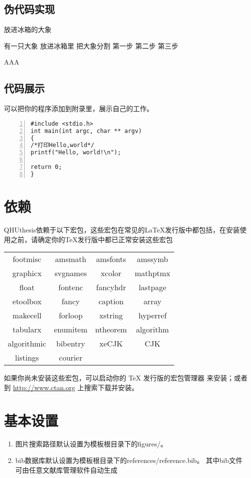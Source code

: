 \subsection{伪代码实现}
\begin{algorithm}
\caption{放进冰箱的大象}\label{算法实例}
\begin{algorithmic}
	\REQUIRE 有一只大象
	\ENSURE 放进冰箱里
	\STATE 把大象分割
	\ENDIF
	\ENDFOR
	\STATE 第一步
	\STATE 第二步
	\STATE 第三步
\end{algorithmic}
AAA\end{algorithm}
\subsection{代码展示}
可以把你的程序添加到附录里，展示自己的工作。
\begin{lstlisting}[language={[ANSI]C}, numbers=left]
#include <stdio.h>
int main(int argc, char ** argv)
{
/*打印Hello,world*/
printf("Hello, world!\n");

return 0;
}
\end{lstlisting}
\section{依赖}
QHUthesis依赖于以下宏包，这些宏包在常见的\LaTeX{}发行版中都包括，在安装使用之前，请确定你的\TeX{}发行版中都已正常安装这些宏包
\begin{table}[H]
	\centering
	\begin{tabular}{cccc}
		\hline
		{footmisc} &  {amsmath} &  {amsfonts} &  {amssymb} \\
		
		{graphicx} &  {svgnames} &  {xcolor} &  {mathptmx} \\
		
		{float} &  {fontenc} &  {fancyhdr} &  {lastpage} \\
		
		{etoolbox} &  {fancy} &  {caption} &  {array} \\
		
		{makecell} &  {forloop} &  {xstring} &  {hyperref} \\
		
		{tabularx} &  {enumitem} &  {ntheorem} &  {algorithm}\\
		
		{algorithmic} &  {bibentry} &  {xeCJK} &  {CJK} \\
		{listings} &  {courier} &  {} &  {} \\
		\hline
	\end{tabular}
\end{table}
如果你尚未安装这些宏包，可以启动你的 \TeX{} 发行版的宏包管理器
来安装；或者到 \url{http://www.ctan.org} 上搜索下载并安装。
\section{基本设置}
\begin{enumerate}
	\item 图片搜索路径默认设置为模板根目录下的figures/。
	\item bib数据库默认设置为模板根目录下的references/reference.bib。 其中bib文件可由任意文献库管理软件自动生成
\end{enumerate}




